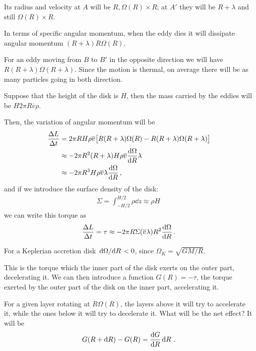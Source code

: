 \documentclass[main.tex]{subfiles}
\begin{document}
Its radius and velocity at \(A\) will be \(R, \Omega(R) \times  R\); at \(A'\) they will be \(R + \lambda \) and still \(\Omega (R) \times R\). 

In terms of specific angular momentum, when the eddy dies it will dissipate angular momentum \((R+\lambda) R \Omega (R) \).

For an eddy moving from \(B\) to \(B'\) in the opposite direction we will have \(R (R + \lambda ) \Omega (R + \lambda )\). 
Since the motion is thermal, on average there will be as many particles going in both direction.


Suppose that the height of the disk is \(H\), then the mass carried by the eddies will be \(H 2 \pi R \overline{v} \rho \). 

Then, the variation of angular momentum will be 
%
\begin{align}
\frac{\Delta L}{\Delta t} &= 2 \pi R H \rho \overline{v} 
\qty[R (R + \lambda ) \Omega (R) - R (R+\lambda ) \Omega (R + \lambda )]  \\
&\approx - 2 \pi R^2 (R+ \lambda ) H \rho \overline{v} \dv{\Omega }{R} \lambda  \\
&\approx - 2\pi R^3 H \rho \overline{v} \lambda \dv{\Omega }{R}
\,,
\end{align}
%
and if we introduce the surface density of the disk: 
%
\begin{align}
\Sigma = \int_{- H/2 }^{H/2} \rho \dd{z} \approx \rho H
\,
\end{align}
%
we can write this torque as
%
\begin{align}
\frac{ \Delta L}{\Delta t} = \tau \approx -2 \pi R \Sigma \qty(\overline{v} \lambda ) R^2 \dv{\Omega }{R}
\,.
\end{align}

For a Keplerian accretion disk \(\dv*{\Omega }{R} < 0\), since \(\Omega _K = \sqrt{GM / R}\). 

This is the torque which the inner part of the disk exerts on the outer part, decelerating it. 
We can then introduce a function \(G(R) = - \tau \), the torque exerted by the outer part of the disk on the inner part, accelerating it. 

For a given layer rotating at \(R \Omega (R)\), the layers above it will try to accelerate it, while the ones below it will try to decelerate it. What will be the net effect? It will be 
%
\begin{align}
G(R + \dd{R}) - G(R) = \dv{G}{R} \dd{R}
\,.
\end{align}
\end{document}
